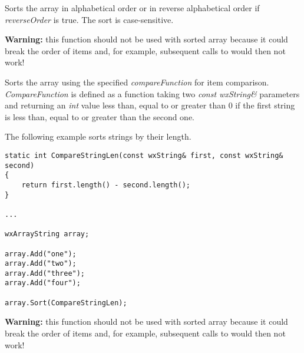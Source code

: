 
Sorts the array in alphabetical order or in reverse alphabetical order if 
{\it reverseOrder} is true. The sort is case-sensitive.

{\bf Warning:} this function should not be used with sorted array because it
could break the order of items and, for example, subsequent calls to 
 would then not work!


Sorts the array using the specified {\it compareFunction} for item comparison.
{\it CompareFunction} is defined as a function taking two {\it const
wxString\&} parameters and returning an {\it int} value less than, equal to or
greater than 0 if the first string is less than, equal to or greater than the
second one.


The following example sorts strings by their length.

\begin{verbatim}
static int CompareStringLen(const wxString& first, const wxString& second)
{
    return first.length() - second.length();
}

...

wxArrayString array;

array.Add("one");
array.Add("two");
array.Add("three");
array.Add("four");

array.Sort(CompareStringLen);
\end{verbatim}

{\bf Warning:} this function should not be used with sorted array because it
could break the order of items and, for example, subsequent calls to 
 would then not work!

